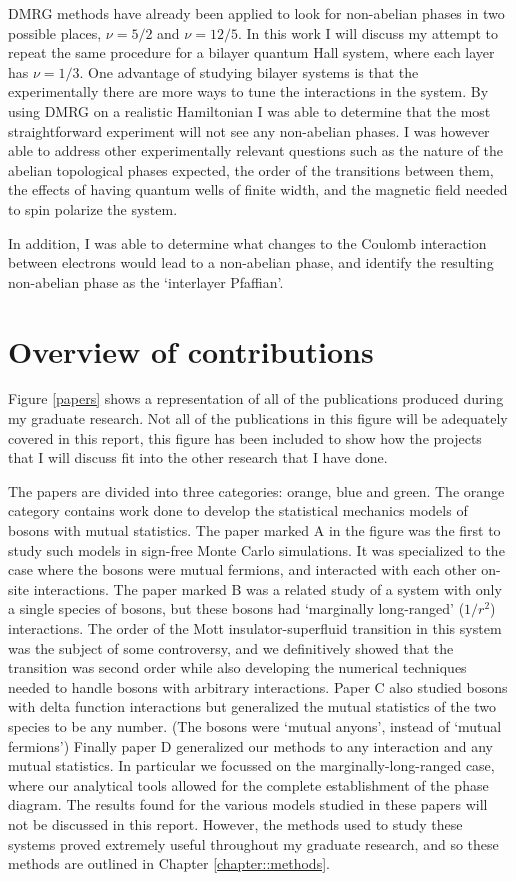 DMRG methods have already been applied to look for non-abelian phases in two possible places, $\nu=5/2$ and $\nu=12/5$. In this work I will discuss my attempt to repeat the same procedure for a bilayer quantum Hall system, where each layer has $\nu=1/3$. One advantage of studying bilayer systems is that the experimentally there are more ways to tune the interactions in the system. By using DMRG on a realistic Hamiltonian I was able to determine that the most straightforward experiment will not see any non-abelian phases. I was however able to address other experimentally relevant questions such as the nature of the abelian topological phases expected, the order of the transitions between them, the effects of having quantum wells of finite width, and the magnetic field needed to spin polarize the system.

In addition, I was able to determine what changes to the Coulomb interaction between electrons would lead to a non-abelian phase, and identify the resulting non-abelian phase as the `interlayer Pfaffian'.

\section{Overview of contributions}

Figure \ref{papers} shows a representation of all of the publications produced during my graduate research. Not all of the publications in this figure will be adequately covered in this report, this figure has been included to show how the projects that I will discuss fit into the other research that I have done. 

The papers are divided into three categories: orange, blue and green. The orange category contains work done to develop the statistical mechanics models of bosons with mutual statistics. The paper marked A in the figure was the first to study such models in sign-free Monte Carlo simulations. It was specialized to the case where the bosons were mutual fermions, and interacted with each other on-site interactions. 
The paper marked B was a related study of a system with only a single species of bosons, but these bosons had `marginally long-ranged' ($1/r^2$) interactions. The order of the Mott insulator-superfluid transition in this system was the subject of some controversy, and we definitively showed that the transition was second order while also developing the numerical techniques needed to handle bosons with arbitrary interactions. 
Paper C also studied bosons with delta function interactions but generalized the mutual statistics of the two species to be any number. (The bosons were `mutual anyons', instead of `mutual fermions') 
Finally paper D generalized our methods to any interaction and any mutual statistics. In particular we focussed on the marginally-long-ranged case, where our analytical tools allowed for the complete establishment of the phase diagram. The results found for the various models studied in these papers will not be discussed in this report. However, the methods used to study these systems proved extremely useful throughout my graduate research, and so these methods are outlined in Chapter \ref{chapter::methods}.


